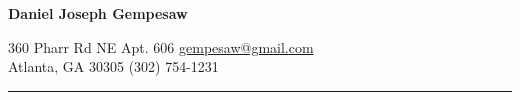 \newcommand{\myauthor}[1] {
  \begin{center}
    \Large
    \textbf{#1}
  \end{center}
  \normalsize}
%
\newcommand{\contact}[4] {
  #1 \hfill \href{mailto:#3}{#3}\\
  #2 \hfill #4\\
  \hrule
}
%
\myauthor{Daniel Joseph Gempesaw}
\contact{360 Pharr Rd NE Apt. 606}
        {Atlanta, GA 30305}
        {gempesaw@gmail.com}
        {(302) 754-1231}
